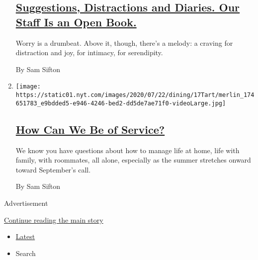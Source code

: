 \begin{enumerate}
  \hypertarget{suggestions-distractions-and-diaries-our-staff-is-an-open-book}{%
  \subsection{\texorpdfstring{\href{/2020/07/23/at-home/newsletter.html}{Suggestions,
  Distractions and Diaries. Our Staff Is an Open
  Book.}}{Suggestions, Distractions and Diaries. Our Staff Is an Open Book.}}\label{suggestions-distractions-and-diaries-our-staff-is-an-open-book}}

  Worry is a drumbeat. Above it, though, there's a melody: a craving for
  distraction and joy, for intimacy, for serendipity.

  By Sam Sifton
\item
  \texttt{[image: https://static01.nyt.com/images/2020/07/22/dining/17Tart/merlin\_174651783\_e9bdded5-e946-4246-bed2-dd5de7ae71f0-videoLarge.jpg]}

  \hypertarget{how-can-we-be-of-service}{%
  \subsection{\texorpdfstring{\href{/2020/07/17/at-home/newsletter.html}{How
  Can We Be of
  Service?}}{How Can We Be of Service?}}\label{how-can-we-be-of-service}}

  We know you have questions about how to manage life at home, life with
  family, with roommates, all alone, especially as the summer stretches
  onward toward September's call.

  By Sam Sifton
\end{enumerate}

Advertisement

\protect\hyperlink{after-mid3}{Continue reading the main story}

\begin{itemize}
\tightlist
\item
  \protect\hyperlink{stream-panel}{Latest}
\item
  Search
\end{itemize}

